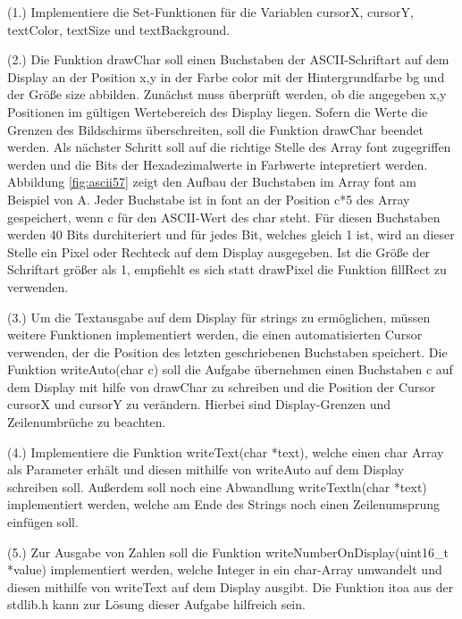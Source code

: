 (1.) Implementiere die Set-Funktionen für die Variablen cursorX, cursorY, textColor, textSize und textBackground.

(2.) Die Funktion drawChar soll einen Buchstaben der ASCII-Schriftart auf dem Display an der Position x,y in der Farbe color mit der Hintergrundfarbe bg und der Größe size abbilden. Zunächst muss überprüft werden, ob die angegeben x,y Positionen im gültigen Wertebereich des Display liegen. Sofern die Werte die Grenzen des Bildschirms überschreiten, soll die Funktion drawChar beendet werden. Als nächster Schritt soll auf die richtige Stelle des Array font zugegriffen werden und die Bits der Hexadezimalwerte in Farbwerte intepretiert werden. Abbildung \ref{fig:ascii57} zeigt den Aufbau der Buchstaben im Array font am Beispiel von A. Jeder Buchstabe ist in font an der Position c*5 des Array gespeichert, wenn c für den ASCII-Wert des char steht. Für diesen Buchstaben werden 40 Bits durchiteriert und für jedes Bit, welches gleich 1 ist, wird an dieser Stelle ein Pixel oder Rechteck auf dem Display ausgegeben. Ist die Größe der Schriftart größer als 1, empfiehlt es sich statt drawPixel die Funktion fillRect zu verwenden. 

(3.) Um die Textausgabe auf dem Display für strings zu ermöglichen, müssen weitere Funktionen implementiert werden, die einen automatisierten Cursor verwenden, der die Position des letzten geschriebenen Buchstaben speichert. Die Funktion writeAuto(char c) soll die Aufgabe übernehmen einen Buchstaben c auf dem Display mit hilfe von drawChar zu schreiben und die Position der Cursor cursorX und cursorY zu verändern. Hierbei sind Display-Grenzen und Zeilenumbrüche zu beachten.

(4.) Implementiere die Funktion writeText(char *text), welche einen char Array als Parameter erhält und diesen mithilfe von writeAuto auf dem Display schreiben soll. Außerdem soll noch eine Abwandlung writeTextln(char *text) implementiert werden, welche am Ende des Strings noch einen Zeilenumsprung einfügen soll.

(5.) Zur Ausgabe von Zahlen soll die Funktion writeNumberOnDisplay(uint16\_t *value) implementiert werden, welche Integer in ein char-Array umwandelt und diesen mithilfe von writeText auf dem Display ausgibt. Die Funktion itoa aus der stdlib.h kann zur Lösung dieser Aufgabe hilfreich sein.
